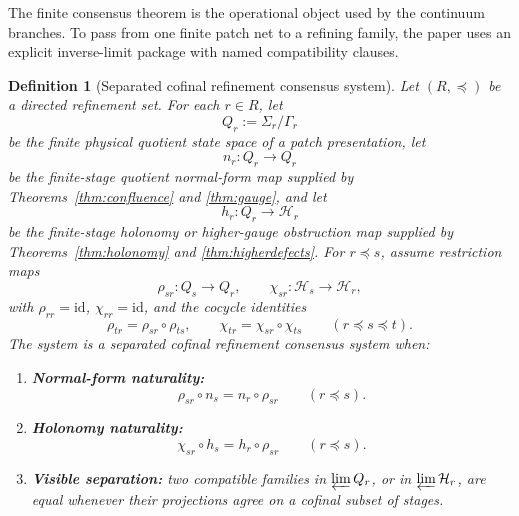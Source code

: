 \documentclass[11pt]{article}
\newtheorem{definition}[theorem]{Definition}
\theoremstyle{remark}
\theoremstyle{plain}
\begin{document}
The finite consensus theorem is the operational object used by the continuum branches. To pass
from one finite patch net to a refining family, the paper uses an explicit inverse-limit package
with named compatibility clauses.

\begin{definition}[Separated cofinal refinement consensus system]\label{def:refinement-consensus}
Let \((R,\preceq)\) be a directed refinement set. For each \(r\in R\), let
\[
Q_r:=\Sigma_r/\Gamma_r
\]
be the finite physical quotient state space of a patch presentation, let
\[
n_r:Q_r\to Q_r
\]
be the finite-stage quotient normal-form map supplied by Theorems~\ref{thm:confluence} and
\ref{thm:gauge}, and let
\[
h_r:Q_r\to \mathcal H_r
\]
be the finite-stage holonomy or higher-gauge obstruction map supplied by
Theorems~\ref{thm:holonomy} and \ref{thm:higherdefects}. For \(r\preceq s\), assume restriction
maps
\[
\rho_{sr}:Q_s\to Q_r,
\qquad
\chi_{sr}:\mathcal H_s\to\mathcal H_r,
\]
with \(\rho_{rr}=\mathrm{id}\), \(\chi_{rr}=\mathrm{id}\), and the cocycle identities
\[
\rho_{tr}=\rho_{sr}\circ\rho_{ts},
\qquad
\chi_{tr}=\chi_{sr}\circ\chi_{ts}
\qquad
(r\preceq s\preceq t).
\]
The system is a separated cofinal refinement consensus system when:
\begin{enumerate}
\item \textbf{Normal-form naturality:}
\[
\rho_{sr}\circ n_s=n_r\circ\rho_{sr}
\qquad
(r\preceq s).
\]
\item \textbf{Holonomy naturality:}
\[
\chi_{sr}\circ h_s=h_r\circ\rho_{sr}
\qquad
(r\preceq s).
\]
\item \textbf{Visible separation:} two compatible families in \(\varprojlim Q_r\), or in
\(\varprojlim \mathcal H_r\), are equal whenever their projections agree on a cofinal subset of
stages.
\end{enumerate}
\end{definition}
\end{document}
